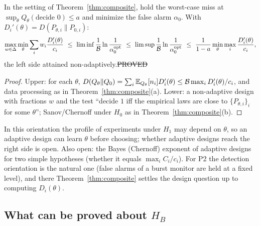 \begin{proposition}\label{prop:composite-fa}
In the setting of Theorem~\ref{thm:composite}, hold the worst-case miss at $\sup_\theta Q_\theta(\text{decide }0)\le a$ and minimize the false alarm $\alpha_0$. With $D_i'(\theta)=D(P_{\theta,i}\|P_{0,i})$:
\[
\max_{w\in\Delta}\min_\theta\sum_iw_i\frac{D_i'(\theta)}{c_i}\ \le\ \liminf\frac1{\mathcal B}\ln\frac1{\alpha_0^{\rm opt}}\ \le\ \limsup\frac1{\mathcal B}\ln\frac1{\alpha_0^{\rm opt}}\ \le\ \frac1{1-a}\min_\theta\max_i\frac{D_i'(\theta)}{c_i},
\]
the left side attained non-adaptively.\hfill\st{PROVED}
\end{proposition}
\begin{proof}
Upper: for each $\theta$, $D(Q_\theta\|Q_0)=\sum_i\mathbb{E}_{Q_\theta}[n_i]D_i'(\theta)\le\mathcal B\max_iD_i'(\theta)/c_i$, and data processing as in Theorem~\ref{thm:composite}(a). Lower: a non-adaptive design with fractions $w$ and the test ``decide $1$ iff the empirical laws are close to $\{P_{\theta,i}\}_i$ for some $\theta$''; Sanov/Chernoff under $H_0$ as in Theorem~\ref{thm:composite}(b).
\end{proof}

\noindent In this orientation the profile of experiments under $H_1$ may depend on $\theta$, so an adaptive design can learn $\theta$ before choosing; whether adaptive designs reach the right side is open. Also open: the Bayes (Chernoff) exponent of adaptive designs for two simple hypotheses (whether it equals $\max_iC_i/c_i$). For P2 the detection orientation is the natural one (false alarms of a burst monitor are held at a fixed level), and there Theorem~\ref{thm:composite} settles the design question up to computing $D_i(\theta)$.

\subsection{What can be proved about $H_B$}\label{sec:hb}

